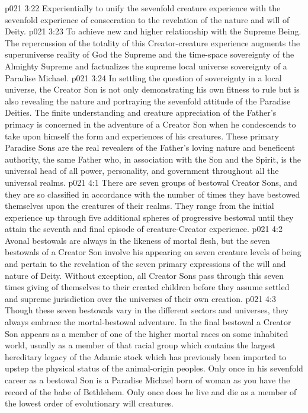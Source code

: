 \vs p021 3:22 \pc {}\bibnobreakspace Experientially to unify the sevenfold creature experience with the sevenfold experience of consecration to the revelation of the nature and will of Deity.
\vs p021 3:23 \pc {}\bibnobreakspace To achieve new and higher relationship with the Supreme Being. The repercussion of the totality of this Creator\hyp{}creature experience augments the superuniverse reality of God the Supreme and the time\hyp{}space sovereignty of the Almighty Supreme and factualizes the supreme local universe sovereignty of a Paradise Michael.
\vs p021 3:24 \pc In settling the question of sovereignty in a local universe, the Creator Son is not only demonstrating his own fitness to rule but is also revealing the nature and portraying the sevenfold attitude of the Paradise Deities. The finite understanding and creature appreciation of the Father’s primacy is concerned in the adventure of a Creator Son when he condescends to take upon himself the form and experiences of his creatures. These primary Paradise Sons are the real revealers of the Father’s loving nature and beneficent authority, the same Father who, in association with the Son and the Spirit, is the universal head of all power, personality, and government throughout all the universal realms.
\vs p021 4:1 There are seven groups of bestowal Creator Sons, and they are so classified in accordance with the number of times they have bestowed themselves upon the creatures of their realms. They range from the initial experience up through five additional spheres of progressive bestowal until they attain the seventh and final episode of creature\hyp{}Creator experience.
\vs p021 4:2 Avonal bestowals are always in the likeness of mortal flesh, but the seven bestowals of a Creator Son involve his appearing on seven creature levels of being and pertain to the revelation of the seven primary expressions of the will and nature of Deity. Without exception, all Creator Sons pass through this seven times giving of themselves to their created children before they assume settled and supreme jurisdiction over the universes of their own creation.
\vs p021 4:3 Though these seven bestowals vary in the different sectors and universes, they always embrace the mortal\hyp{}bestowal adventure. In the final bestowal a Creator Son appears as a member of one of the higher mortal races on some inhabited world, usually as a member of that racial group which contains the largest hereditary legacy of the Adamic stock which has previously been imported to upstep the physical status of the animal\hyp{}origin peoples. Only once in his sevenfold career as a bestowal Son is a Paradise Michael born of woman as you have the record of the babe of Bethlehem. Only once does he live and die as a member of the lowest order of evolutionary will creatures.
